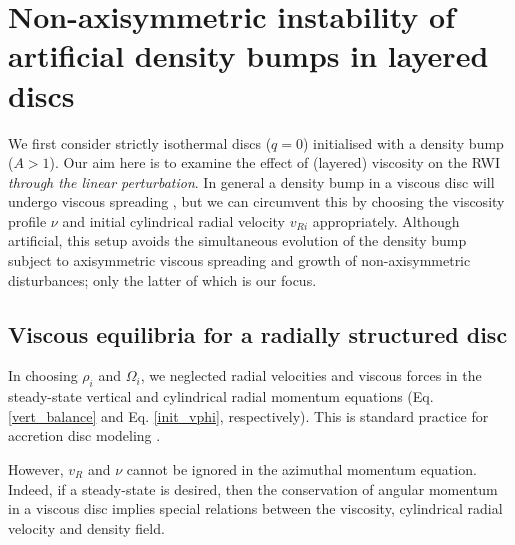 \section{Non-axisymmetric instability of artificial density bumps in
  layered discs}\label{density_bump} 
We first consider strictly isothermal discs ($q=0$) initialised with a
density bump ($A>1$). Our aim here
is to examine the effect of (layered) viscosity on the RWI 
\emph{through the linear perturbation}. 
In general a density bump in a viscous disc will undergo viscous
spreading \citep{lyndenbell74}, but we can circumvent this 
by choosing the viscosity profile $\nu$ and initial cylindrical radial
velocity $v_{Ri}$ appropriately. 
Although artificial, this setup avoids 
the simultaneous evolution of the density bump subject to
axisymmetric viscous spreading and growth of
non-axisymmetric disturbances; only the latter of which is our focus. 


\subsection{Viscous equilibria for a radially structured
  disc}\label{visc_eq}  
In choosing $\rho_i$ and $\Omega_i$, we neglected radial
velocities and viscous forces in the steady-state vertical and
cylindrical radial momentum equations (Eq. \ref{vert_balance} and
Eq. \ref{init_vphi}, respectively). This is standard practice for
accretion disc modeling \citep[e.g.][]{takeuchi02}.   

However, $v_{R}$ and $\nu$ cannot be ignored in the azimuthal
momentum equation. Indeed, if a steady-state is desired, then the
conservation of angular momentum in a viscous disc implies special
relations between the viscosity, cylindrical radial velocity and
density field. 

